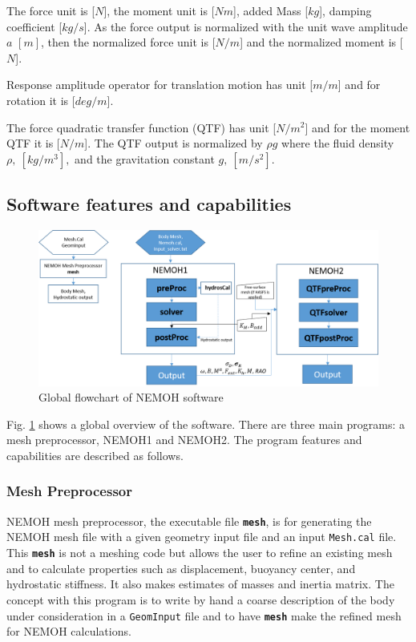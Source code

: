 \documentclass[12pt,a4paper,titlepage]{article}
\begin{document}
The force unit is [$N$], the moment unit is [$Nm$], added Mass [$kg$], damping coefficient [$kg/s$]. As the force output is normalized with the unit wave amplitude $a$ $[m]$, then the normalized force unit is [$N/m$] and the normalized moment is [$N$]. 

Response amplitude operator for translation motion has unit [$m/m$] and for rotation it is [$deg/m$]. 

The force quadratic transfer function (QTF) has unit [$N/m^2$] and for the moment QTF it is [$N/m$]. The QTF output is normalized by $\rho g$ where the fluid density $\rho,\ [kg/m^3],$ and the gravitation constant $g,\ [m/s^2]$.

\subsection{Software    features and capabilities}
\begin{figure}[ht]
\centering
\includegraphics[scale=0.6,trim = 0mm 0mm 0mm 0mm, clip]{figures/FlowChart.png}	
\caption{Global flowchart of NEMOH software}\label{fig:flowchart}
\end{figure}

Fig. \ref{fig:flowchart} shows a global overview of the software. There are three main programs: a mesh preprocessor, NEMOH1 and NEMOH2. The program features and capabilities are described as follows.

\subsubsection{Mesh Preprocessor}
NEMOH mesh preprocessor, the executable file \texttt{\textbf{mesh}}, is for generating the NEMOH mesh file with a given geometry input file and an input \texttt{Mesh.cal} file. This \texttt{\textbf{mesh}} is not a meshing code but allows the user to refine an existing mesh and to calculate properties such as displacement, buoyancy center, and hydrostatic stiffness. It also makes estimates of masses and inertia matrix. The concept with this program is to write by hand a coarse description of the body under consideration in a \texttt{GeomInput} file and to have \texttt{\textbf{mesh}} make the refined mesh for NEMOH calculations.
\end{document}
